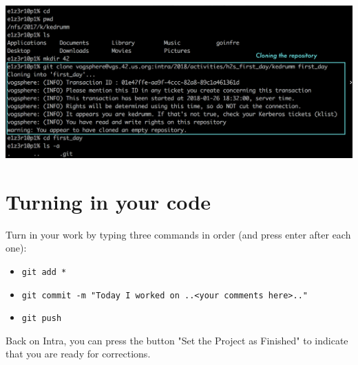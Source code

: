 \documentclass{42-en}
\begin{document}
\includegraphics[width=1\textwidth]{screenshots/clone_first_day}


\chapter{Turning in your code}

Turn in your work by typing three commands in order (and press enter after each one):
	\begin{itemize}
		\item \texttt{git add *}
		\item \texttt{git commit -m "Today I worked on ..<your comments here>.."}
		\item \texttt{git push}
	\end{itemize}

Back on Intra, you can press the button "Set the Project as Finished" to indicate that you are ready for corrections.



\end{document}

